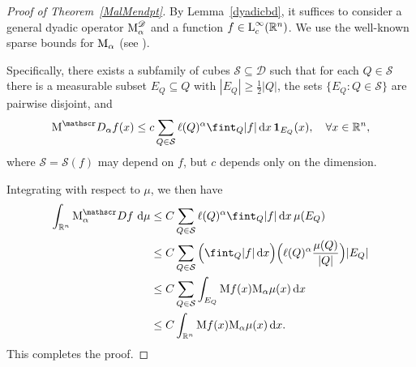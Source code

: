 \documentclass[11pt, a4paper, reqno]{amsart}
\newcommand{\R}{\mathbb R}
\newcommand{\Dy}{\mathscr D}
\newcommand{\al}{\alpha}
\newcommand{\dx}{\,{\mathrm dx}}
\newcommand{\dmu}{\,{\mathrm d\mu}}
\newcommand{\Lup}{\textup{L}}
\theoremstyle{definition}
\theoremstyle{remark}
\begin{document}
\begin{proof}[Proof of Theorem~\ref{MalMendpt}]
By Lemma~\ref{dyadicbd}, it suffices to consider a general dyadic operator $\textup{M}_\al^\Dy$ and a function $f\in \Lup^\infty_c(\R^n)$. We use the well-known sparse bounds for $\textup{M}_\al$ (see \cite[Theorem 5.1]{CM}).  

Specifically, there exists a subfamily of cubes $\mathcal S \subseteq \Dy$ such that for each $Q\in \mathcal S$ there is a measurable subset $E_Q \subseteq Q$ with $|E_Q|\ge \frac12|Q|$, the sets $\{E_Q: Q\in \mathcal S\}$ are pairwise disjoint, and
\[
\textup M^\Dy_\al f(x) \le c\sum_{Q\in \mathcal S} \ell(Q)^\al \fint_Q |f| \dx \,\mathbf 1_{E_Q}(x), \quad \forall x\in \R^n,
\]
where $\mathcal S=\mathcal S(f)$ may depend on $f$, but $c$ depends only on the dimension.  

Integrating with respect to $\mu$, we then have
\begin{align*}
\int_{\R^n} \textup M_\al^\Dy f \,\dmu
&\le C\sum_{Q\in \mathcal S} \ell(Q)^\al \fint_Q |f| \dx \, \mu(E_Q) \\
&\le C\sum_{Q\in \mathcal S} \Big(\fint_Q |f| \dx\Big) \Big(\ell(Q)^\al \frac{\mu(Q)}{|Q|}\Big) |E_Q| \\
&\le C\sum_{Q\in \mathcal S} \int_{E_Q} \textup M f(x) \textup M_\al \mu(x) \dx \\
&\le C \int_{\R^n} \textup M f(x) \textup M_\al \mu(x) \dx.
\end{align*}
This completes the proof.
\end{proof}
\end{document}
